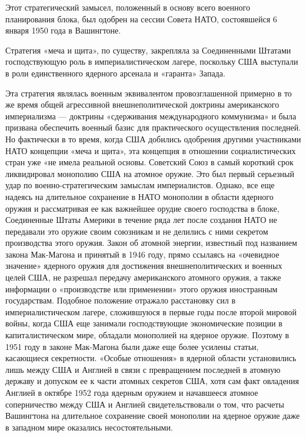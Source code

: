 \documentclass[12pt, a4paper, openany]{book}
\begin{document}
	Этот стратегический замысел, положенный в основу всего военного планирования блока, был одобрен на сессии Совета НАТО, состоявшейся 6 января 1950 года в Вашингтоне.
	
	Стратегия «меча и щита», по существу, закрепляла за Соединенными Штатами господствующую роль в империалистическом лагере, поскольку США выступали в роли единственного ядерного арсенала и «гаранта» Запада.
	
	Эта стратегия являлась военным эквивалентом провозглашенной примерно в то же время общей агрессивной внешнеполитической доктрины американского империализма — доктрины «сдерживания международного коммунизма» и была призвана обеспечить военный базис для практического осуществления последней. Но фактически в то время, когда США добились одобрения другими участниками НАТО концепции «меча и щита», эта концепция в отношении социалистических стран уже «не имела реальной основы. Советский Союз в самый короткий срок ликвидировал монополию США на атомное оружие. Это был первый серьезный удар по военно-стратегическим замыслам империалистов. Однако, все еще надеясь на длительное сохранение в НАТО монополии в области ядерного оружия и рассматривая ее как важнейшее орудие своего господства в блоке, Соединенные Штаты Америки в течение ряда лет после создания НАТО не передавали это оружие своим союзникам и не делились с ними секретом производства этого оружия. Закон об атомной энергии, известный под названием закона Мак-Магона и принятый в 1946 году, прямо ссылаясь на «очевидное значение» ядерного оружия для достижения внешнеполитических и военных целей США, не разрешал передачу американского атомного оружия, а также информации о «производстве или применении» этого оружия иностранным государствам. Подобное положение отражало расстановку сил в империалистическом лагере, сложившуюся в первые годы после второй мировой войны, когда США еще занимали господствующие экономические позиции в капиталистическом мире, обладали монополией на ядерное оружие. Поэтому в 1951 году в законе Мак-Магона были даже еще более усилены статьи, касающиеся секретности. «Особые отношения» в ядерной области установились лишь между США и Англией в связи с превращением последней в атомную державу и допуском ее к части атомных секретов США, хотя сам факт овладения Англией в октябре 1952 года ядерным оружием и начавшееся атомное соперничество между США и Англией свидетельствовали о том, что расчеты Вашингтона на длительное сохранение своей монополии на ядерное оружие даже в западном мире оказались несостоятельными.
	
\end{document}

